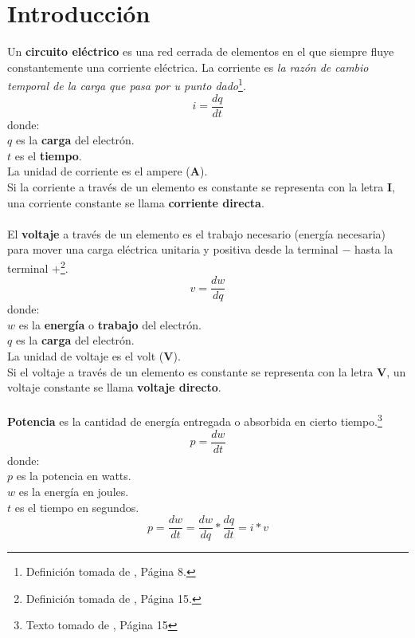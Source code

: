 \documentclass[twocolumn]{IEEEtran}
\begin{document}
\section{Introducción}
\noindent
Un \textbf{circuito eléctrico} es una red cerrada de elementos en el que siempre
fluye constantemente una corriente eléctrica. La corriente es \textit{la razón
de cambio temporal de la carga que pasa por u punto dado}\footnote{Definición
tomada de \cite{dorf}, Página 8.}.
\begin{equation}
 i=\frac{dq}{dt}
  \label{equ1}
\end{equation}
\noindent
donde:\\
$q$ es la \textbf{carga} del electrón.\\
$t$ es el \textbf{tiempo}.\\
La unidad de corriente es el ampere (\textbf{A}).\\
Si la corriente a través de un elemento es constante se representa con la letra
\textbf{I}, una corriente constante se llama \textbf{corriente directa}.\\\\
El \textbf{voltaje} a través de un elemento es el trabajo necesario (energía
necesaria) para mover una carga eléctrica unitaria y positiva desde la terminal
$-$ hasta la terminal $+$\footnote{Definición tomada de \cite{dorf}, Página
15.}.
\begin{equation}
 v=\frac{dw}{dq}
  \label{equ2}
\end{equation}
donde:\\
$w$ es la \textbf{energía} o \textbf{trabajo} del electrón.\\
$q$ es la \textbf{carga} del electrón.\\
La unidad de voltaje es el volt (\textbf{V}).\\
Si el voltaje a través de un elemento es constante se representa con la letra
\textbf{V}, un voltaje constante se llama \textbf{voltaje directo}.\\\\
\textbf{Potencia} es la cantidad de energía entregada o absorbida en cierto
tiempo.\footnote{Texto tomado de \cite{dorf}, Página 15}
\begin{equation}
 p=\frac{dw}{dt}
\label{equ3}
\end{equation}
\noindent
donde:\\
$p$ es la potencia en watts.\\
$w$ es la energía en joules.\\
$t$ es el tiempo en segundos.
\begin{equation}
 p=\frac{dw}{dt}=\frac{dw}{dq}*\frac{dq}{dt}=i*v
\label{equ4}
\end{equation}
\end{document}
